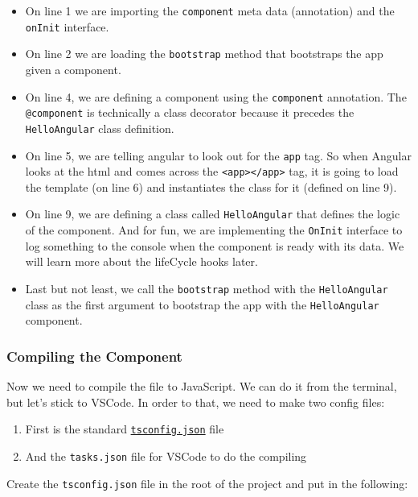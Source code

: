\documentclass[12pt,]{article}
\providecommand{\tightlist}{%
  \setlength{\itemsep}{0pt}\setlength{\parskip}{0pt}}
\begin{document}
\begin{itemize}
\tightlist
\item
  On line 1 we are importing the \texttt{component} meta data
  (annotation) and the \texttt{onInit} interface.
\item
  On line 2 we are loading the \texttt{bootstrap} method that bootstraps
  the app given a component.
\item
  On line 4, we are defining a component using the \texttt{component}
  annotation. The \texttt{@component} is technically a class decorator
  because it precedes the \texttt{HelloAngular} class definition.
\item
  On line 5, we are telling angular to look out for the \texttt{app}
  tag. So when Angular looks at the html and comes across the
  \texttt{\textless{}app\textgreater{}\textless{}/app\textgreater{}}
  tag, it is going to load the template (on line 6) and instantiates the
  class for it (defined on line 9).
\item
  On line 9, we are defining a class called \texttt{HelloAngular} that
  defines the logic of the component. And for fun, we are implementing
  the \texttt{OnInit} interface to log something to the console when the
  component is ready with its data. We will learn more about the
  lifeCycle hooks later.
\item
  Last but not least, we call the \texttt{bootstrap} method with the
  \texttt{HelloAngular} class as the first argument to bootstrap the app
  with the \texttt{HelloAngular} component.
\end{itemize}

\subsubsection{Compiling the Component}\label{compiling-the-component}

Now we need to compile the file to JavaScript. We can do it from the
terminal, but let's stick to VSCode. In order to that, we need to make
two config files:

\begin{enumerate}
\def\labelenumi{\arabic{enumi}.}
\item
  First is the standard
  \href{http://json.schemastore.org/tsconfig}{\texttt{tsconfig.json}}
  file
\item
  And the \texttt{tasks.json} file for VSCode to do the compiling
\end{enumerate}

Create the \texttt{tsconfig.json} file in the root of the project and
put in the following:
\end{document}
